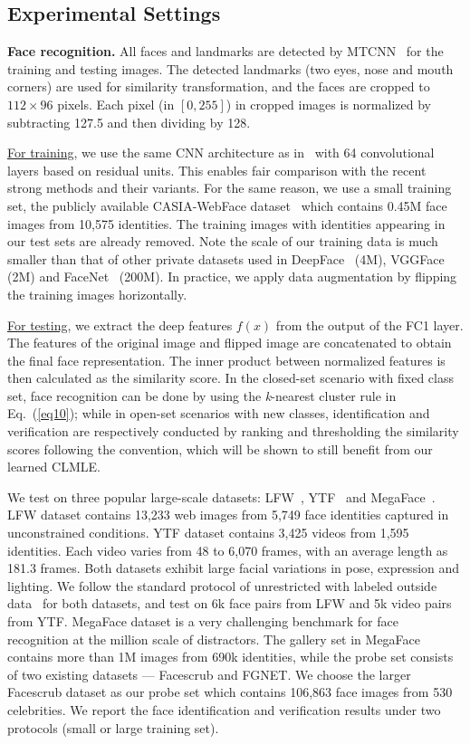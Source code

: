\documentclass[10pt,journal,compsoc]{IEEEtran}
\begin{document}
\subsection{Experimental Settings}

\noindent
{\bf Face recognition.} All faces and landmarks are detected by MTCNN~\cite{Zhang_7553523} for the training and testing images. The detected landmarks (two eyes, nose and mouth corners) are used for similarity transformation, and the faces are cropped to $112\times 96$ pixels. Each pixel (in $[0,255]$) in cropped images is normalized by subtracting 127.5 and then dividing by 128.

\underline{For training}, we use the same CNN architecture as in~\cite{liu2017sphereface,2018Wang} with 64 convolutional layers based on residual units. This enables fair comparison with the recent strong methods and their variants. For the same reason, we use a small training set, the publicly available CASIA-WebFace dataset~\cite{YiLLL14a} which contains 0.45M face images from 10,575 identities. The training images with identities appearing in our test sets are already removed. Note the scale of our training data is much smaller than that of other private datasets used in DeepFace~\cite{Taigman14} (4M), VGGFace~\cite{Parkhi15} (2M) and FaceNet~\cite{Schroff15} (200M). In practice, we apply data augmentation by flipping the training images horizontally.


\underline{For testing}, we extract the deep features $f(x)$ from the output of the FC1 layer. The features of the original image and flipped image are concatenated to obtain the final face representation. The inner product between normalized features is then calculated as the similarity score. In the closed-set scenario with fixed class set, face recognition can be done by using the \textit{k}-nearest cluster rule in Eq.~(\ref{eq10}); while in open-set scenarios with new classes, identification and verification are respectively conducted by ranking and thresholding the similarity scores following the convention, which will be shown to still benefit from our learned CLMLE.

We test on three popular large-scale datasets: LFW~\cite{LFWTech}, YTF~\cite{Wolf_2011} and MegaFace~\cite{kemelmacher2016megaface}. LFW dataset contains 13,233 web images from 5,749 face identities captured in unconstrained conditions. YTF dataset contains 3,425 videos from 1,595 identities. Each video varies from 48 to 6,070 frames, with an average length as 181.3 frames. Both datasets exhibit large facial variations in pose, expression and lighting. We follow the standard protocol of unrestricted with labeled outside data~\cite{LFWTech} for both datasets, and test on 6k face pairs from LFW and 5k video pairs from YTF. MegaFace dataset is a very challenging benchmark for face recognition at the million scale of distractors. The gallery set in MegaFace contains more than 1M images from 690k identities, while the probe set consists of two existing datasets --- Facescrub and FGNET. We choose the larger Facescrub dataset as our probe set which contains 106,863 face images from 530 celebrities. We report the face identification and verification results under two protocols (small or large training set).
\end{document}
